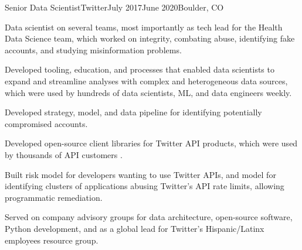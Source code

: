 \documentclass[print]{ag-cv} %
\begin{document}
\begin{job}
  {}{Senior Data Scientist}{Twitter}{July 2017}{June 2020}{Boulder, CO}{
    Data scientist on several teams, most importantly as tech lead for the Health Data Science team,
    which worked on integrity, combating abuse, identifying fake accounts, and studying misinformation problems.
    

    \begin{myitemize}
      \item Developed tooling, education, and processes that enabled data scientists to expand and streamline analyses 
      with complex and heterogeneous data sources, which were used by hundreds of data scientists, ML, and data
      engineers weekly.

      \item Developed strategy, model, and data pipeline for identifying potentially compromised accounts.

      \item Developed open-source client libraries for Twitter API products,
      which were used by thousands of API customers
      \autocite{search_tweets_python,do_more_with_twitter_data}.

      \item Built risk model for developers wanting to use Twitter APIs, and model for identifying clusters of
      applications abusing Twitter's API rate limits, allowing programmatic remediation.

      \item Served on company advisory groups for data architecture, open-source software, Python development,
      and as a global lead for Twitter's Hispanic/Latinx employees resource group.

    \end{myitemize}
  }
\end{job}
\end{document}
